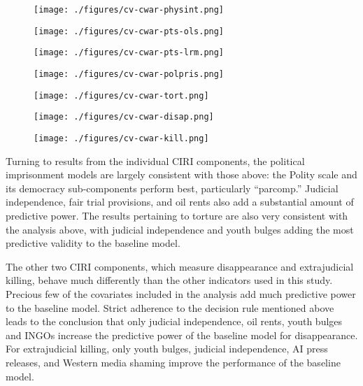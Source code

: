 \documentclass[12pt]{article}
\begin{document}
\begin{figure}[!htpb]
\centering
\texttt{[image: ./figures/cv-cwar-physint.png]}
\caption{}
\label{fig:cv-cwar-physint}
\end{figure}

\begin{figure}[!htpb]
\centering
\texttt{[image: ./figures/cv-cwar-pts-ols.png]}
\caption{}
\label{fig:cv-cwar-pts-ols}
\end{figure}

\begin{figure}[!htpb]
\centering
\texttt{[image: ./figures/cv-cwar-pts-lrm.png]}
\caption{}
\label{fig:cv-cwar-pts-lrm}
\end{figure}

\begin{figure}[!htpb]
\centering
\texttt{[image: ./figures/cv-cwar-polpris.png]}
\caption{}
\label{fig:cv-cwar-polpris}
\end{figure}

\begin{figure}[!htpb]
\centering
\texttt{[image: ./figures/cv-cwar-tort.png]}
\caption{}
\label{fig:cv-cwar-tort}
\end{figure}

\begin{figure}[!htpb]
\centering
\texttt{[image: ./figures/cv-cwar-disap.png]}
\caption{}
\label{fig:cv-cwar-disap}
\end{figure}

\begin{figure}[!htpb]
\centering
\texttt{[image: ./figures/cv-cwar-kill.png]}
\caption{}
\label{fig:cv-cwar-kill}
\end{figure}

Turning to results from the individual CIRI components, the political imprisonment models are largely consistent with those above: the Polity scale and its democracy sub-components perform best, particularly ``parcomp.'' Judicial independence, fair trial provisions, and oil rents also add a substantial amount of predictive power. The results pertaining to torture are also very consistent with the analysis above, with judicial independence and youth bulges adding the most predictive validity to the baseline model. 

The other two CIRI components, which measure disappearance and extrajudicial killing, behave much differently than the other indicators used in this study. Precious few of the covariates included in the analysis add much predictive power to the baseline model. Strict adherence to the decision rule mentioned above leads to the conclusion that only judicial independence, oil rents, youth bulges and INGOs increase the predictive power of the baseline model for disappearance. For extrajudicial killing, only youth bulges, judicial independence, AI press releases, and Western media shaming improve the performance of the baseline model. 
\end{document}
